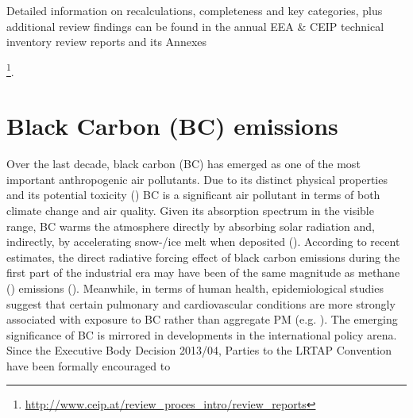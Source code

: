 Detailed information on recalculations, completeness and key
categories, plus additional review findings can be found in the annual
EEA \& CEIP technical inventory review reports  \citep{CEIP2019} and
its
Annexes{\footnote{\url{http://www.ceip.at/review_proces_intro/review_reports}}. 

\section{Black Carbon (BC) emissions}  
\label{sec:bc}

Over the last decade, black carbon (BC) has emerged as one of the most important anthropogenic air pollutants.  %
Due to its distinct physical properties and its potential toxicity (\cite{Janssen:2012}) BC is a significant air pollutant in terms of both climate change and air quality. Given its absorption spectrum in the visible range, BC warms the atmosphere directly by absorbing solar radiation and, indirectly, by accelerating snow-/ice melt when deposited (\cite{BonDohFah13}). According to recent estimates, the direct radiative forcing effect of black carbon emissions during the first part of the industrial era may have been of the same magnitude as methane (\chiv) emissions (\cite{BonDohFah13,Wang2016}). Meanwhile, in terms of human health, epidemiological studies suggest that certain pulmonary and cardiovascular conditions are more strongly associated with exposure to BC rather than aggregate PM (e.g. \cite{Baumgartner:2014}). 
The emerging significance of BC is mirrored in developments in the international policy arena.
Since the Executive Body Decision 2013/04, Parties to the LRTAP Convention have been formally encouraged to
}
